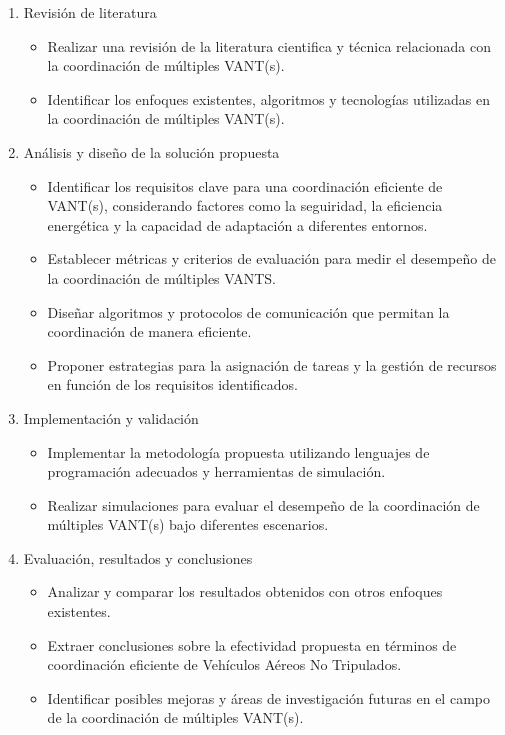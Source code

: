 \documentclass[11pt,epsf,times]{article}
\begin{document}
\begin{enumerate}
\item Revisión de literatura
  \begin{itemize}
  \item Realizar una revisión de la literatura cientifica y técnica relacionada con la coordinación de múltiples VANT(s).
  \item Identificar los enfoques existentes, algoritmos y tecnologías utilizadas en la coordinación de múltiples VANT(s).
  \end{itemize}
\item Análisis y diseño de la solución propuesta
  \begin{itemize}
  \item Identificar los requisitos clave para una coordinación eficiente de VANT(s), considerando factores como la seguiridad, la eficiencia energética y la capacidad de adaptación a diferentes entornos.
  \item Establecer métricas y criterios de evaluación para medir el desempeño de la coordinación de múltiples VANTS.
  \item Diseñar algoritmos y protocolos de comunicación que permitan la coordinación de manera eficiente.
    \item Proponer estrategias para la asignación de tareas y la gestión de recursos en función de los requisitos identificados.
  \end{itemize}
\item Implementación y validación
  \begin{itemize}
  \item Implementar la metodología propuesta utilizando lenguajes de programación adecuados y herramientas de simulación.
  \item Realizar simulaciones para evaluar el desempeño de la coordinación de múltiples VANT(s) bajo diferentes escenarios.
  \end{itemize}
\item Evaluación, resultados y conclusiones

  \begin{itemize}
  \item Analizar y comparar los resultados obtenidos con otros enfoques existentes.
  \item Extraer conclusiones sobre la efectividad propuesta en términos de coordinación eficiente de Vehículos Aéreos No Tripulados.
  \item Identificar posibles mejoras y áreas de investigación futuras en el campo de la coordinación de múltiples VANT(s).
  \end{itemize}
\end{enumerate}
\end{document}
